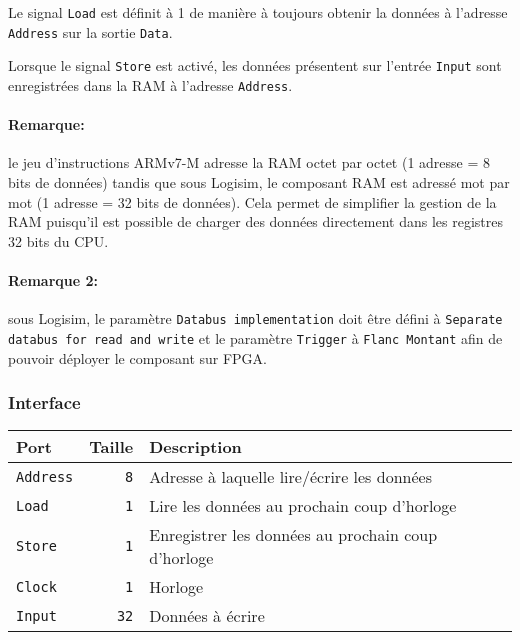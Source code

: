 \documentclass{article}
\begin{document}
    Le signal \texttt{Load} est définit à 1 de manière à toujours obtenir la données à l'adresse \texttt{Address} sur la sortie \texttt{Data}.

    Lorsque le signal \texttt{Store} est activé, les données présentent sur l'entrée \texttt{Input} sont enregistrées dans la RAM à l'adresse \texttt{Address}.

    \paragraph{Remarque:} le jeu d'instructions ARMv7-M adresse la RAM octet par octet (1 adresse = 8 bits de données) tandis que sous Logisim, le composant RAM est adressé mot par mot (1 adresse = 32 bits de données).
    Cela permet de simplifier la gestion de la RAM puisqu'il est possible de charger des données directement dans les registres 32 bits du CPU.

    \paragraph{Remarque 2:} sous Logisim, le paramètre \texttt{Databus implementation} doit être défini à \texttt{Separate databus for read and write}
    et le paramètre \texttt{Trigger} à \texttt{Flanc Montant} afin de pouvoir déployer le composant sur FPGA.

    \subsubsection{Interface}


    \begin{tabular}{|l|r|l|}
        \hline
        \textbf{Port}   & \textbf{Taille} & \textbf{Description}                               \\
        \hline

        \texttt{Address} & \texttt{8}      & Adresse à laquelle lire/écrire les données         \\
        \hline
        \texttt{Load}   & \texttt{1}      & Lire les données au prochain coup d'horloge        \\
        \hline
        \texttt{Store}  & \texttt{1}      & Enregistrer les données au prochain coup d'horloge \\
        \hline
        \texttt{Clock}  & \texttt{1}      & Horloge                                            \\
        \hline
        \texttt{Input}  & \texttt{32}     & Données à écrire                                   \\


        \hline
    \end{tabular}
\end{document}
